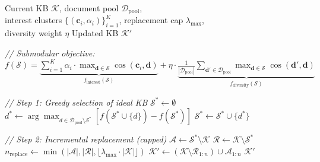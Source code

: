 \begin{algorithm}[t]
\caption{Submodular KB Curation (Incremental Replacement)}
\label{alg:curation}
\begin{algorithmic}[1]
\REQUIRE Current KB $\mathcal{K}$, document pool $\mathcal{D}_{\mathrm{pool}}$, \\
\quad interest clusters $\{(\mathbf{c}_i, \alpha_i)\}_{i=1}^{K}$, replacement cap $\lambda_{\max}$, \\
\quad diversity weight $\eta$
\ENSURE Updated KB $\mathcal{K}'$

\STATE \textit{// Submodular objective:}
\STATE $f(\mathcal{S}) = \underbrace{\sum_{i=1}^{K} \alpha_i \cdot \max_{\mathbf{d} \in \mathcal{S}} \cos(\mathbf{c}_i, \mathbf{d})}_{f_{\text{interest}}(\mathcal{S})} + \eta \cdot \underbrace{\frac{1}{|\mathcal{D}_{\mathrm{pool}}|} \sum_{\mathbf{d}' \in \mathcal{D}_{\mathrm{pool}}} \max_{\mathbf{d} \in \mathcal{S}} \cos(\mathbf{d}', \mathbf{d})}_{f_{\text{diversity}}(\mathcal{S})}$

\STATE \textit{// Step 1: Greedy selection of ideal KB}
\STATE $\mathcal{S}^* \leftarrow \emptyset$
    \STATE $d^* \leftarrow \arg\max_{d \in \mathcal{D}_{\mathrm{pool}} \setminus \mathcal{S}^*} \left[ f(\mathcal{S}^* \cup \{d\}) - f(\mathcal{S}^*) \right]$
    \STATE $\mathcal{S}^* \leftarrow \mathcal{S}^* \cup \{d^*\}$
\ENDFOR

\STATE \textit{// Step 2: Incremental replacement (capped)}
\STATE $\mathcal{A} \leftarrow \mathcal{S}^* \setminus \mathcal{K}$ 
\STATE $\mathcal{R} \leftarrow \mathcal{K} \setminus \mathcal{S}^*$ 
\STATE $n_{\text{replace}} \leftarrow \min(|\mathcal{A}|, |\mathcal{R}|, \lfloor \lambda_{\max} \cdot |\mathcal{K}| \rfloor)$
\STATE $\mathcal{K}' \leftarrow (\mathcal{K} \setminus \mathcal{R}_{1:n}) \cup \mathcal{A}_{1:n}$ 
\RETURN $\mathcal{K}'$
\end{algorithmic}
\end{algorithm}

% 
